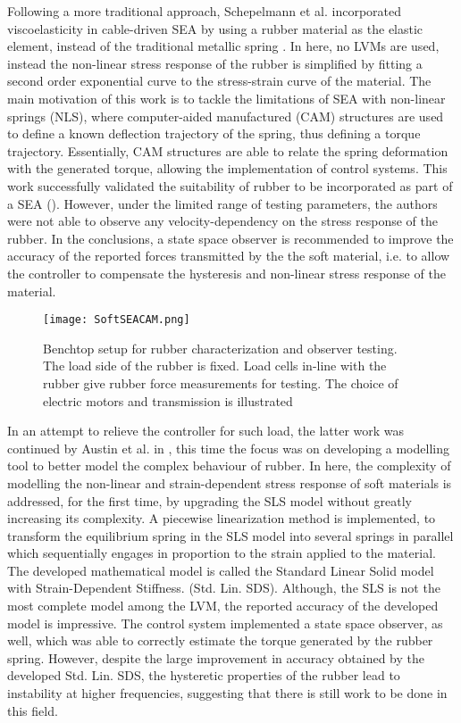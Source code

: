 Following a more traditional approach, Schepelmann et al. incorporated viscoelasticity in cable-driven SEA by using a rubber material as the elastic element, instead of the traditional metallic spring \cite{schepelmann2014compact}. In here, no LVMs are used, instead the non-linear stress response of the rubber is simplified by fitting a second order exponential curve to the stress-strain curve of the material. The main motivation of this work is to tackle the limitations of SEA with non-linear springs (NLS), where computer-aided manufactured (CAM) structures are used to define a known deflection trajectory of the spring, thus defining a torque trajectory. Essentially, CAM structures are able to relate the spring deformation with the generated torque, allowing the implementation of control systems. This work successfully validated the suitability of rubber to be incorporated as part of a SEA (). However, under the limited range of testing parameters, the authors were not able to observe any velocity-dependency on the stress response of the rubber. In the conclusions, a state space observer is recommended to improve the accuracy of the reported forces transmitted by the the soft material, i.e. to allow the controller to compensate the hysteresis and non-linear stress response of the material.

\begin{figure}[htb!]
    \centering
    \texttt{[image: SoftSEACAM.png]}
    \caption{Benchtop setup for rubber characterization and observer testing. The load side of the rubber is fixed. Load cells in-line with the rubber give rubber force measurements for testing. The choice of electric motors and transmission is illustrated \cite{schepelmann2014compact}}
    \label{fig:softSEACAM}
\end{figure}

In an attempt to relieve the controller for such load, the latter work was continued by Austin et al. in \cite{austin2015control}, this time the focus was on developing a modelling tool to better model the complex behaviour of rubber. In here, the complexity of modelling the non-linear and strain-dependent stress response of soft materials is addressed, for the first time, by upgrading the SLS model without greatly increasing its complexity. A piecewise linearization method is implemented, to transform the equilibrium spring in the SLS model into several springs in parallel which sequentially engages in proportion to the strain applied to the material. The developed mathematical model is called the Standard Linear Solid model with Strain-Dependent Stiffness. (Std. Lin. SDS). Although, the SLS is not the most complete model among the LVM, the reported accuracy of the developed model is impressive. The control system implemented a state space observer, as well, which was able to correctly estimate the torque generated by the rubber spring. However, despite the large improvement in accuracy obtained by the developed Std. Lin. SDS, the hysteretic properties of the rubber  lead to instability at higher frequencies, suggesting that there is still work to be done in this field.

